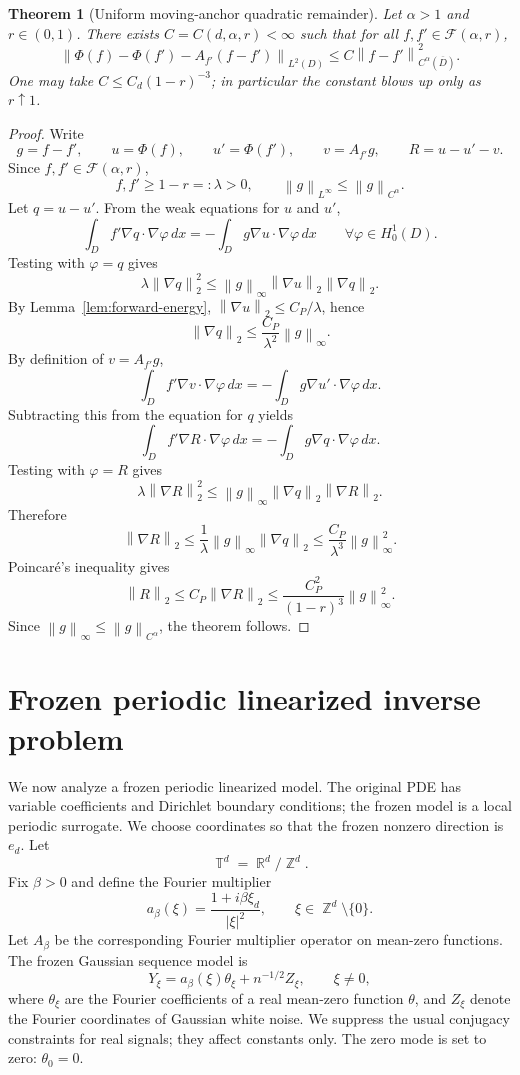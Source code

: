 \documentclass[12pt]{article}
\newtheorem{theorem}{Theorem}[section]
\theoremstyle{remark}
\DeclareMathOperator{\R}{\mathbb R}
\DeclareMathOperator{\Z}{\mathbb Z}
\DeclareMathOperator{\T}{\mathbb T}
\newcommand{\norm}[1]{\left\lVert #1\right\rVert}
\begin{document}
\begin{theorem}[Uniform moving-anchor quadratic remainder]
\label{thm:moving-anchor}
Let \(\alpha>1\) and \(r\in(0,1)\). There exists \(C=C(d,\alpha,r)<\infty\) such that for all \(f,f'\in\mathcal F(\alpha,r)\),
\[
\norm{\Phi(f)-\Phi(f')-A_{f'}(f-f')}_{L^2(D)}
\le
C\norm{f-f'}_{C^\alpha(\overline D)}^2.
\]
One may take \(C\le C_d(1-r)^{-3}\); in particular the constant blows up only as \(r\uparrow1\).
\end{theorem}
\begin{proof}
Write
\[
g=f-f',
\qquad
u=\Phi(f),
\qquad
u'=\Phi(f'),
\qquad
v=A_{f'}g,
\qquad
R=u-u'-v.
\]
Since \(f,f'\in\mathcal F(\alpha,r)\),
\[
f,f'\ge 1-r=:\lambda>0,
\qquad
\norm{g}_{L^\infty}\le \norm{g}_{C^\alpha}.
\]
Let \(q=u-u'\). From the weak equations for \(u\) and \(u'\),
\[
\int_D f'\nabla q\cdot\nabla\varphi\,dx
=
-\int_D g\nabla u\cdot\nabla\varphi\,dx
\qquad \forall\varphi\in H^1_0(D).
\]
Testing with \(\varphi=q\) gives
\[
\lambda\norm{\nabla q}_2^2
\le
\norm{g}_\infty\norm{\nabla u}_2\norm{\nabla q}_2.
\]
By Lemma~\ref{lem:forward-energy}, \(\norm{\nabla u}_2\le C_P/\lambda\), hence
\[
\norm{\nabla q}_2
\le
\frac{C_P}{\lambda^2}\norm{g}_\infty.
\]
By definition of \(v=A_{f'}g\),
\[
\int_D f'\nabla v\cdot\nabla\varphi\,dx
=
-\int_D g\nabla u'\cdot\nabla\varphi\,dx.
\]
Subtracting this from the equation for \(q\) yields
\[
\int_D f'\nabla R\cdot\nabla\varphi\,dx
=
-\int_D g\nabla q\cdot\nabla\varphi\,dx.
\]
Testing with \(\varphi=R\) gives
\[
\lambda\norm{\nabla R}_2^2
\le
\norm{g}_\infty\norm{\nabla q}_2\norm{\nabla R}_2.
\]
Therefore
\[
\norm{\nabla R}_2
\le
\frac1\lambda\norm{g}_\infty\norm{\nabla q}_2
\le
\frac{C_P}{\lambda^3}\norm{g}_\infty^2.
\]
Poincar\'e's inequality gives
\[
\norm{R}_2
\le
C_P\norm{\nabla R}_2
\le
\frac{C_P^2}{(1-r)^3}\norm{g}_\infty^2.
\]
Since \(\norm{g}_\infty\le\norm{g}_{C^\alpha}\), the theorem follows.
\end{proof}

\section{Frozen periodic linearized inverse problem}
\label{sec:frozen}

We now analyze a frozen periodic linearized model. The original PDE has variable coefficients and Dirichlet boundary conditions; the frozen model is a local periodic surrogate. We choose coordinates so that the frozen nonzero direction is \(e_d\). Let
\[
\T^d=\R^d/\Z^d.
\]
Fix \(\beta>0\) and define the Fourier multiplier
\[
a_\beta(\xi)=\frac{1+i\beta\xi_d}{|\xi|^2},
\qquad
\xi\in\Z^d\setminus\{0\}.
\]
Let \(A_\beta\) be the corresponding Fourier multiplier operator on mean-zero functions. The frozen Gaussian sequence model is
\begin{equation}
\label{eq:frozen-model}
Y_\xi=a_\beta(\xi)\theta_\xi+n^{-1/2}Z_\xi,
\qquad \xi\neq0,
\end{equation}
where \(\theta_\xi\) are the Fourier coefficients of a real mean-zero function \(\theta\), and \(Z_\xi\) denote the Fourier coordinates of Gaussian white noise. We suppress the usual conjugacy constraints for real signals; they affect constants only. The zero mode is set to zero: \(\theta_0=0\).
\end{document}
